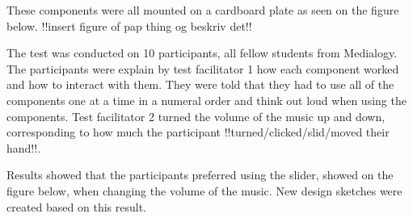 These components were all mounted on a cardboard plate as seen on the figure below.
!!insert figure of pap thing og beskriv det!!

The test was conducted on 10 participants, all fellow students from Medialogy. The participants were explain by test facilitator 1 how each component worked and how to interact with them. They were told that they had to use all of the components one at a time in a numeral order and think out loud when using the components. Test facilitator 2 turned the volume of the music up and down, corresponding to how much the participant !!turned/clicked/slid/moved their hand!!.

Results showed that the participants preferred using the slider, showed on the figure below, when changing the volume of the music. New design sketches were created based on this result.







